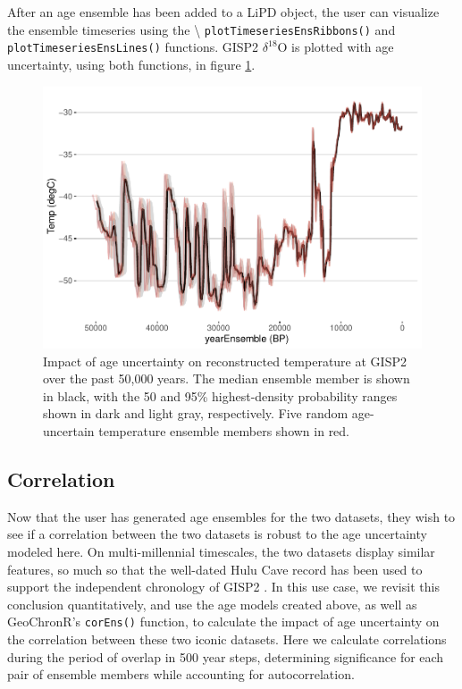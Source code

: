 \documentclass[gchron, manuscript]{copernicus}
\begin{document}
After an age ensemble has been added to a LiPD object, the user can visualize the ensemble timeseries using the \textbackslash{} \texttt{plotTimeseriesEnsRibbons()} and \texttt{plotTimeseriesEnsLines()} functions.
GISP2 \(\delta^{18}\)O is plotted with age uncertainty, using both functions, in figure \ref{fig:timeseries}.

\begin{figure}
\includegraphics[width=12cm]{geoChronR-paper_files/figure-latex/timeseries-1} \caption{Impact of age uncertainty on reconstructed temperature at GISP2 over the past 50,000 years. The median ensemble member is shown in black, with the 50 and 95\% highest-density probability ranges shown in dark and light gray, respectively. Five random age-uncertain temperature ensemble members shown in red.}\label{fig:timeseries}
\end{figure}

\subsection{Correlation}

Now that the user has generated age ensembles for the two datasets, they wish to see if a correlation between the two datasets is robust to the age uncertainty modeled here.
On multi-millennial timescales, the two datasets display similar features, so much so that the well-dated Hulu Cave record has been used to support the independent chronology of GISP2 \citep{hulu2001}.
In this use case, we revisit this conclusion quantitatively, and use the age models created above, as well as GeoChronR's \texttt{corEns()} function, to calculate the impact of age uncertainty on the correlation between these two iconic datasets.
Here we calculate correlations during the period of overlap in 500 year steps, determining significance for each pair of ensemble members while accounting for autocorrelation.
\end{document}
